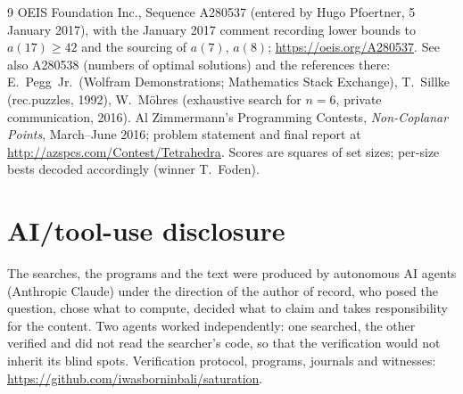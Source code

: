 \documentclass[11pt,a4paper]{article}
\begin{document}
\begin{thebibliography}{9}
 OEIS Foundation Inc., Sequence A280537 (entered by Hugo Pfoertner, 5 January 2017), with the
January 2017 comment recording lower bounds to $a(17)\ge42$ and the sourcing of $a(7)$, $a(8)$;
\url{https://oeis.org/A280537}.  See also A280538 (numbers of optimal solutions) and the
references there: E.~Pegg~Jr.\ (Wolfram Demonstrations; Mathematics Stack Exchange), T.~Sillke
(rec.puzzles, 1992), W.~M\"ohres (exhaustive search for $n=6$, private communication, 2016).
 Al Zimmermann's Programming Contests, \emph{Non-Coplanar Points}, March--June
2016; problem statement and final report at \url{http://azspcs.com/Contest/Tetrahedra}.  Scores
are squares of set sizes; per-size bests decoded accordingly (winner T.~Foden).
\end{thebibliography}

\section*{AI/tool-use disclosure}
The searches, the programs and the text were produced by autonomous AI agents (Anthropic Claude)
under the direction of the author of record, who posed the question, chose what to compute,
decided what to claim and takes responsibility for the content.  Two agents worked independently:
one searched, the other verified and did not read the searcher's code, so that the verification
would not inherit its blind spots.  Verification protocol, programs, journals and witnesses:
\url{https://github.com/iwasborninbali/saturation}.
\end{document}
